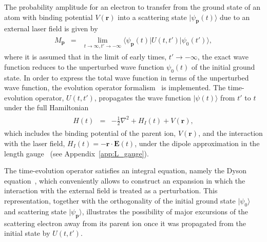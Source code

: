 The probability amplitude for an electron to transfer from the ground
state of an atom with binding potential $V(\mathbf{r})$ into a
scattering state $|\psi_{\mathbf{p}}(t)\rangle$ due to an external
laser field is given by~\cite{Kopold_1997sfa}
\begin{eqnarray}
\label{eq:matrix_element}
\begin{split}
M_{\mathbf{p}} & = & \lim_{t\to\infty,t'\to -\infty}
{\langle \psi_{\mathbf{p}}(t) | U(t,t') | \psi_{0}(t') \rangle},
\end{split}
\end{eqnarray}
where it is assumed that in the limit of early times, $t'\to -\infty$,
the exact wave function reduces to the unperturbed wave function
$\psi_{0}(t)$ of the initial ground state. In order to express the
total wave function in terms of the unperturbed wave function, the
evolution operator formalism~\cite{BeckerTEOp_2006} is
implemented. The time-evolution operator, $U(t,t')$, propagates the
wave function $|\psi(t)\rangle$ from $t'$ to $t$ under the full
Hamiltonian
%
\begin{eqnarray}
\label{eq:H_ati}
\begin{split}
H(t) & = & -\frac{1}{2} \nabla^{2} + H_{I}(t) + V(\mathbf{r}),
\end{split}
\end{eqnarray}
%
which includes the binding potential of the parent ion,
$V(\mathbf{r})$, and the interaction with the laser field,
$H_{I}(t)=-\mathbf{r}\cdot\mathbf{E}(t)$, under the dipole
approximation in the length gauge~\cite{Kopold_1997sfa} (see
Appendix~\ref{app:L_gauge}).

The time-evolution operator satisfies an integral equation, namely the
Dyson equation~\cite{Kopold_1997sfa, cjp2010_keldysh}, which
conveniently allows to construct an expansion in which the interaction
with the external field is treated as a perturbation. This
representation, together with the orthogonality of the initial ground
state $|\psi_{0}\rangle$ and scattering state
$|\psi_{\mathbf{p}}\rangle$, illustrates the possibility of major
excursions of the scattering electron away from its parent ion once it
was propagated from the initial state by $U(t,t')$.

